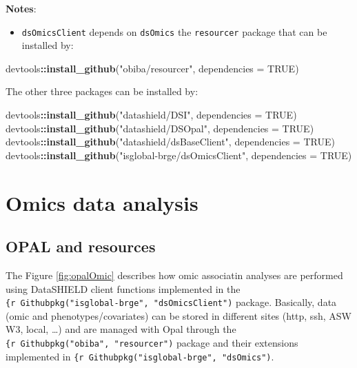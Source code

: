 \documentclass[]{article}
\newenvironment{Shaded}{\begin{snugshade}}{\end{snugshade}}
\newcommand{\DataTypeTok}[1]{\textcolor[rgb]{0.13,0.29,0.53}{#1}}
\newcommand{\KeywordTok}[1]{\textcolor[rgb]{0.13,0.29,0.53}{\textbf{#1}}}
\newcommand{\NormalTok}[1]{#1}
\newcommand{\OperatorTok}[1]{\textcolor[rgb]{0.81,0.36,0.00}{\textbf{#1}}}
\newcommand{\OtherTok}[1]{\textcolor[rgb]{0.56,0.35,0.01}{#1}}
\newcommand{\StringTok}[1]{\textcolor[rgb]{0.31,0.60,0.02}{#1}}
\providecommand{\tightlist}{%
  \setlength{\itemsep}{0pt}\setlength{\parskip}{0pt}}
\begin{document}
\textbf{Notes}:

\begin{itemize}
\tightlist
\item
  \texttt{dsOmicsClient} depends on \texttt{dsOmics} the
  \texttt{resourcer} package that can be installed by:
\end{itemize}

\begin{Shaded}
\begin{Highlighting}[]
\NormalTok{devtools}\OperatorTok{::}\KeywordTok{install\_github}\NormalTok{(}\StringTok{"obiba/resourcer"}\NormalTok{, }\DataTypeTok{dependencies =} \OtherTok{TRUE}\NormalTok{) }
\end{Highlighting}
\end{Shaded}

The other three packages can be installed by:

\begin{Shaded}
\begin{Highlighting}[]
\NormalTok{devtools}\OperatorTok{::}\KeywordTok{install\_github}\NormalTok{(}\StringTok{"datashield/DSI"}\NormalTok{, }\DataTypeTok{dependencies =} \OtherTok{TRUE}\NormalTok{)}
\NormalTok{devtools}\OperatorTok{::}\KeywordTok{install\_github}\NormalTok{(}\StringTok{"datashield/DSOpal"}\NormalTok{, }\DataTypeTok{dependencies =} \OtherTok{TRUE}\NormalTok{)}
\NormalTok{devtools}\OperatorTok{::}\KeywordTok{install\_github}\NormalTok{(}\StringTok{"datashield/dsBaseClient"}\NormalTok{, }\DataTypeTok{dependencies =} \OtherTok{TRUE}\NormalTok{)}
\NormalTok{devtools}\OperatorTok{::}\KeywordTok{install\_github}\NormalTok{(}\StringTok{"isglobal{-}brge/dsOmicsClient"}\NormalTok{, }\DataTypeTok{dependencies =} \OtherTok{TRUE}\NormalTok{)}
\end{Highlighting}
\end{Shaded}

\hypertarget{omics-data-analysis}{%
\section{Omics data analysis}\label{omics-data-analysis}}

\hypertarget{opal-and-resources}{%
\subsection{OPAL and resources}\label{opal-and-resources}}

The Figure \ref{fig:opalOmic} describes how omic associatin analyses are
performed using DataSHIELD client functions implemented in the
\texttt{\{r\ Githubpkg("isglobal-brge",\ "dsOmicsClient")} package.
Basically, data (omic and phenotypes/covariates) can be stored in
different sites (http, ssh, ASW W3, local, \ldots) and are managed with
Opal through the \texttt{\{r\ Githubpkg("obiba",\ "resourcer")} package
and their extensions implemented in
\texttt{\{r\ Githubpkg("isglobal-brge",\ "dsOmics")}.
\end{document}
